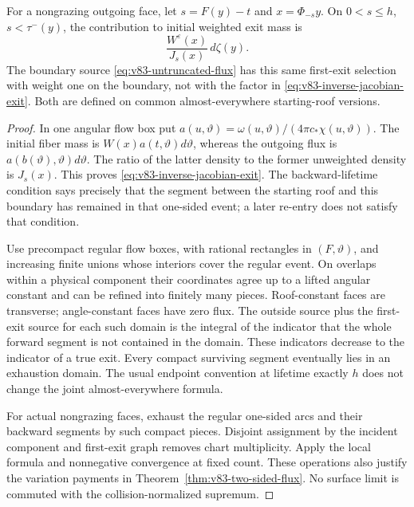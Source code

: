 \begin{proposition}
\label{prop:v83-first-exit-kernel}
For a nongrazing outgoing face, let $s=F(y)-t$ and $x=\Phi_{-s}y$.
On $0<s\le h$, $s<\tau^-(y)$, the contribution to initial weighted
exit mass is
\begin{equation}\label{eq:v83-inverse-jacobian-exit}
                 \frac{W^\varepsilon(x)}{J_s(x)}\,d\zeta(y).
\end{equation}
The boundary source \eqref{eq:v83-untruncated-flux} has this same
first-exit selection with weight one on the boundary, not with the
factor in \eqref{eq:v83-inverse-jacobian-exit}. Both are defined on
common almost-everywhere starting-roof versions.
\end{proposition}
\begin{proof}
In one angular flow box put
$a(u,\vartheta)=\omega(u,\vartheta)/(4\pi c_*\chi(u,\vartheta))$.
The initial fiber mass is $W(x)a(t,\vartheta)d\vartheta$, whereas
the outgoing flux is $a(b(\vartheta),\vartheta)d\vartheta$.
The ratio of the latter density to the former unweighted density is
$J_s(x)$. This proves \eqref{eq:v83-inverse-jacobian-exit}. The
backward-lifetime condition says precisely that the segment between
the starting roof and this boundary has remained in that one-sided
event; a later re-entry does not satisfy that condition.

Use precompact regular flow boxes, with rational rectangles in
$(F,\vartheta)$, and increasing finite unions whose interiors cover
the regular event. On overlaps within a physical component their
coordinates agree up to a lifted angular constant and can be refined
into finitely many pieces. Roof-constant faces are transverse;
angle-constant faces have zero flux. The outside source plus the
first-exit source for each such domain is the integral of the
indicator that the whole forward segment is not contained in the
domain. These indicators decrease to the indicator of a true exit.
Every compact surviving segment eventually lies in an exhaustion
domain. The usual endpoint convention at lifetime exactly $h$ does
not change the joint almost-everywhere formula.

For actual nongrazing faces, exhaust the regular one-sided arcs and
their backward segments by such compact pieces. Disjoint assignment
by the incident component and first-exit graph removes chart
multiplicity. Apply the local formula and nonnegative convergence
at fixed count. These operations also justify the variation payments
in Theorem~\ref{thm:v83-two-sided-flux}. No surface limit is commuted
with the collision-normalized supremum.
\end{proof}

